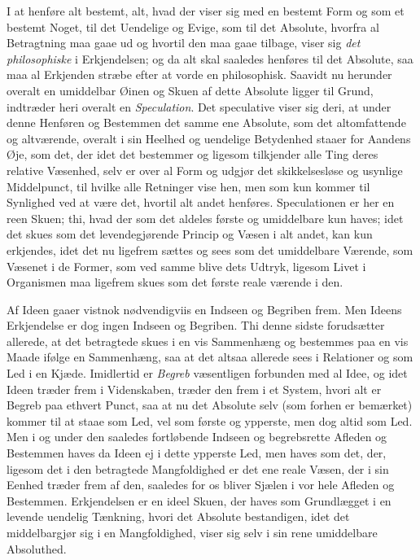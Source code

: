 \documentclass[12pt,a4paper]{book}
\newcommand{\apage}[1]{\marginnote{\footnotesize\textit{[#1]}}}
\begin{document}
I at henføre alt bestemt, alt, hvad der viser sig med en bestemt Form og som et
bestemt Noget, til det Uendelige og Evige, som til det Absolute, hvorfra al
Betragtning maa gaae ud og hvortil den maa gaae tilbage, viser sig \emph{det
philosophiske} i Erkjendelsen; og da alt skal saaledes henføres til det
Absolute, saa maa al Erkjenden stræbe efter at vorde en philosophisk. Saavidt nu
herunder overalt en umiddelbar Øinen og Skuen af dette Absolute ligger til Grund,
indtræder heri overalt en \emph{Speculation}. Det speculative viser sig deri, at
under denne Henføren og Bestemmen det samme ene Absolute, som det altomfattende og
altværende, overalt i sin Heelhed og uendelige Betydenhed staaer for Aandens Øje,
som det, der idet det bestemmer og ligesom tilkjender alle Ting deres relative
Væsenhed, selv er over al Form og udgjør det skikkelsesløse og usynlige
Middelpunct, til hvilke alle Retninger vise hen, men som kun kommer til Synlighed
ved at være det, hvortil alt andet henføres. Speculationen er her en reen Skuen;
thi, hvad der som det aldeles første og umiddelbare kun haves; idet det skues som
det levendegjørende Princip og Væsen i alt andet, kan kun erkjendes, idet det nu
ligefrem sættes og sees som det umiddelbare Værende, som Væsenet i de Former, som
ved samme blive dets Udtryk, ligesom Livet i Organismen maa ligefrem skues som det
første reale værende i den.

\apage{122} Af Ideen gaaer vistnok nødvendigviis en Indseen og Begriben frem. Men Ideens
Erkjendelse er dog ingen Indseen og Begriben. Thi denne sidste forudsætter
allerede, at det betragtede skues i en vis Sammenhæng og bestemmes paa en vis
Maade ifølge en Sammenhæng, saa at det altsaa allerede sees i Relationer og som
Led i en Kjæde. Imidlertid er \emph{Begreb} væsentligen forbunden med al Idee, og idet
Ideen træder frem i Videnskaben, træder den frem i et System, hvori alt er Begreb
paa ethvert Punct, saa at nu det Absolute selv (som forhen er bemærket) kommer til
at staae som Led, vel som første og ypperste, men dog altid som Led. Men i og
under den saaledes fortløbende Indseen og begrebsrette Afleden og Bestemmen haves
da Ideen ej i dette ypperste Led, men haves som det, der, ligesom det i den
betragtede Mangfoldighed er det ene reale Væsen, der i sin Eenhed træder frem af
den, saaledes for os bliver Sjælen i vor hele Afleden og Bestemmen. Erkjendelsen
er en ideel Skuen, der haves som Grundlægget i en levende uendelig Tænkning,
hvori det Absolute bestandigen, idet det middelbargjør sig i en Mangfoldighed,
viser sig selv i sin rene umiddelbare Absoluthed.
\end{document}
